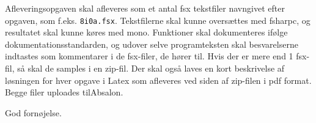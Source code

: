 \documentclass[a4paper,12pt]{article}
\begin{document}
Afleveringsopgaven skal afleveres som et antal fsx tekstfiler navngivet efter opgaven, som f.eks. \lstinline!8i0a.fsx!. Tekstfilerne skal kunne oversættes med fsharpc, og resultatet skal kunne køres med mono. Funktioner skal dokumenteres ifølge dokumentationsstandarden, og udover selve programteksten skal besvarelserne indtastes som kommentarer i de fsx-filer, de hører til. Hvis der er mere end 1 fsx-fil, så skal de samples i en zip-fil. Der skal også laves en kort beskrivelse af løsningen for hver opgave i Latex som afleveres ved siden af zip-filen i pdf format. Begge filer uploades tilAbsalon.

\flushright God fornøjelse.
\end{document}
